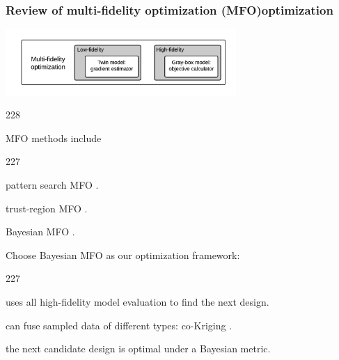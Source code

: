 \documentclass{beamer}
\let\oldcite=\cite
\renewcommand{\cite}[1]{\textcolor[rgb]{.4,.4,.85}{\oldcite{#1}}}
\newcommand{\barrow}{\item[\color{darkred}\ding{228}]}
\newcommand{\carrow}{\item[\color{darkred}\ding{227}]}
\begin{document}
\begin{frame}
    \frametitle{Review of multi-fidelity optimization (MFO)\hfill \scriptsize{optimization}}\small
    \vspace{-.4cm}
    \begin{center}
        \includegraphics[height=2.5cm]{mfo.png}
    \end{center}
    \vspace{-.4cm}
    \begin{dinglist}{228}
    \vspace{-.2cm}
    \barrow MFO methods include\vspace{.1cm}
               \begin{dinglist}{227}
                   \carrow pattern search MFO \scriptsize \cite{Booker 99}. \vspace{0.1cm}
                   \small
                   \carrow trust-region MFO \scriptsize \cite{Wild 13, March 12, Robinson 06}.\vspace{.1cm}
                   \small
                   \carrow Bayesian MFO \scriptsize \cite{Kennedy 01, March 11}.
               \end{dinglist}
    \vspace{.12cm}
    \barrow Choose Bayesian MFO as our optimization framework:\vspace{.1cm}
               \begin{dinglist}{227}
                   \small
                   \carrow uses all high-fidelity model evaluation to find the next design.\vspace{.1cm}
                   \small
                   \carrow can fuse sampled data of different types: co-Kriging \scriptsize \cite{Chung 02}.\vspace{.1cm}
                   \small
                   \carrow the next candidate design is optimal under a Bayesian metric.\vspace{.1cm}
               \end{dinglist}
    \end{dinglist}
\end{frame}
\end{document}

